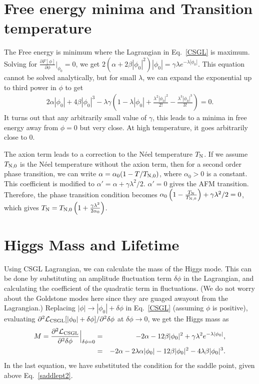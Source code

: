 \documentclass[aps,floatfix,prl]{revtex4}
\begin{document}
\section{Free energy minima and Transition temperature}
The Free energy is minimum where the Lagrangian in Eq.~\eqref{CSGL} is maximum. Solving for $\frac{\partial F[\phi]}{\partial \phi}|_{\phi_0}=0$, we get $2\left(\alpha+2\beta|\phi_0|^2\right)|\phi_0| = \gamma\lambda e^{-\lambda|\phi_0|}$. This equation cannot be solved analytically, but for small $\lambda$, we can expand the exponential up to third power in $\phi$ to get 
\begin{eqnarray}
2\alpha|\phi_0|+4\beta|\phi_0|^3-\lambda \gamma (1-\lambda|\phi_0|+\frac{\lambda^2|\phi_0|^2}{2!}-\frac{\lambda^3|\phi_0|^3}{3!})=0.
\label{saddlept2}
\end{eqnarray}
It turns out that any arbitrarily small value of $\gamma$, this leads to a minima in free energy away from $\phi=0$ but very close. At high temperature, it goes arbitrarily close to 0. 

The axion term leads to a correction to the N\'eel temperature $T_{\rm N}$. If we assume $T_{\rm N,0}$ is the N\'eel temperature without the axion term, then for a second order phase transition, we can write { $\alpha=\alpha_0(1-T/T_{\rm N,0})$}, where $\alpha_0>0$ is a constant. This coefficient is modified to  
$\alpha'=\alpha+\gamma\lambda^2/2$. $\alpha'=0$ gives the AFM transition. Therefore, the phase transition condition becomes $\alpha_0\left(1-\frac{T_{\rm N}}{T_{\rm N,0}}\right) + \gamma\lambda^2/2 = 0$, which gives $T_{\rm N}=T_{\rm N,0}\left(1+\frac{\gamma\lambda^2}{2 \alpha_0}\right)$.

\section{ Higgs Mass and Lifetime}
Using CSGL Lagrangian, we can calculate the mass of the Higgs mode. This can be done by substituting an amplitude fluctuation term $\delta\phi$ in the Lagrangian, and calculating the coefficient of the quadratic term in fluctuations. (We do not worry about the Goldstone modes here since they are guaged awayout from the Lagrangian.) Replacing $|\phi|\to |\phi_0|+\delta \phi$ in Eq.~\eqref{CSGL} (assuming $\phi$ is positive), evaluating $\partial^2 \mathcal{L}_{\rm CSGL}[|\phi_0|+\delta \phi]/\partial^2 \delta \phi$ at $\delta \phi\to 0$, we get the Higgs mass as
{
\begin{eqnarray}
M=\frac{\partial^2 \mathcal{L}_{\rm CSGL}}{\partial^2 \delta \phi}\Big|_{\delta\phi=0}&=&-2\alpha-12\beta|\phi_0|^2+\gamma\lambda^2e^{-\lambda |\phi_0|},\nonumber\\
&=&-2\alpha  -2\lambda\alpha|\phi_0|-12\beta|\phi_0|^2 -4\lambda\beta|\phi_0|^3.
\end{eqnarray}
}
In the last equation, we have substituted the condition for the saddle point, given above Eq.~\eqref{saddlept2}.
\end{document}
